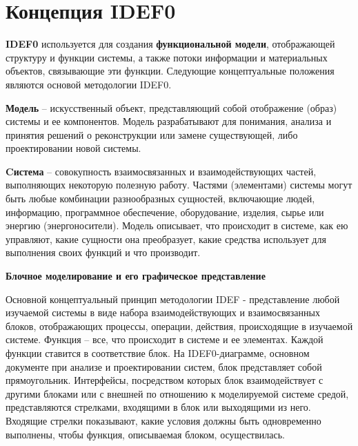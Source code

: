 \documentclass[a4paper, final]{article}
\begin{document}
\newpage
\section{Концепция IDEF0}
\textbf{IDEF0} используется для создания \textbf{функциональной модели}, отображающей структуру и функции системы, а также потоки информации и материальных объектов, связывающие эти функции.
Следующие концептуальные положения являются основой методологии IDEF0.

\par \textbf{Модель} -- искусственный объект, представляющий собой отображение (образ) системы и ее компонентов. Модель разрабатывают для понимания, анализа и принятия решений о реконструкции или замене существующей, либо проектировании новой системы. 
\par \textbf{Cистема} -- совокупность взаимосвязанных и взаимодействующих частей, выполняющих некоторую полезную работу. Частями (элементами) системы могут быть любые комбинации разнообразных сущностей, включающие людей, информацию, программное обеспечение, оборудование, изделия, сырье или энергию (энергоносители). Модель описывает, что происходит в системе, как ею управляют, какие сущности она преобразует, какие средства использует для выполнения своих функций и что производит.

\par \textbf{Блочное моделирование и его графическое представление} 
\par Основной концептуальный принцип методологии IDEF - представление любой изучаемой системы в виде набора взаимодействующих и взаимосвязанных блоков, отображающих процессы, операции, действия, происходящие в изучаемой системе. 
Функция -- все, что происходит в системе и ее элементах. Каждой функции ставится в соответствие блок. На IDEF0-диаграмме, основном документе при анализе и проектировании систем, блок представляет собой прямоугольник. Интерфейсы, посредством которых блок взаимодействует с другими блоками или с внешней по отношению к моделируемой системе средой, представляются стрелками, входящими в блок или выходящими из него. Входящие стрелки показывают, какие условия должны быть одновременно выполнены, чтобы функция, описываемая блоком, осуществилась.
\end{document}
